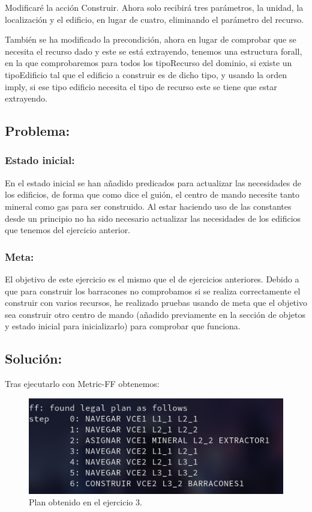 \documentclass[11pt, spanish]{article}
\begin{document}
Modificaré la acción Construir. Ahora solo recibirá tres parámetros, la unidad, la localización y el edificio, en lugar de cuatro, eliminando el parámetro del recurso.

También se ha modificado la precondición, ahora en lugar de comprobar que se necesita el recurso dado y este se está extrayendo, tenemos una estructura forall, en la que comprobaremos para todos los tipoRecurso del dominio, si existe un tipoEdificio tal que el edificio a construir es de dicho tipo, y usando la orden imply, si ese tipo edificio necesita el tipo de recurso este se tiene que estar extrayendo.

\subsection{Problema:}

\subsubsection{Estado inicial:}

En el estado inicial se han añadido predicados para actualizar las necesidades de los edificios, de forma que como dice el guión, el centro de mando necesite tanto mineral como gas para ser construido. Al estar haciendo uso de las constantes desde un principio no ha sido necesario actualizar las necesidades de los edificios que tenemos del ejercicio anterior.

\subsubsection{Meta:}

El objetivo de este ejercicio es el mismo que el de ejercicios anteriores. Debido a que para construir los barracones no comprobamos si se realiza correctamente el construir con varios recursos, he realizado pruebas usando de meta que el objetivo sea construir otro centro de mando (añadido previamente en la sección de objetos y estado inicial para inicializarlo) para comprobar que funciona.

\subsection{Solución:}

Tras ejecutarlo con Metric-FF obtenemos:


\begin{figure}[H]
	\centering
	\includegraphics[scale=0.4]{plan3.png}
	\caption{Plan obtenido en el ejercicio 3.}
	\label{plan3}
\end{figure}
\end{document}
